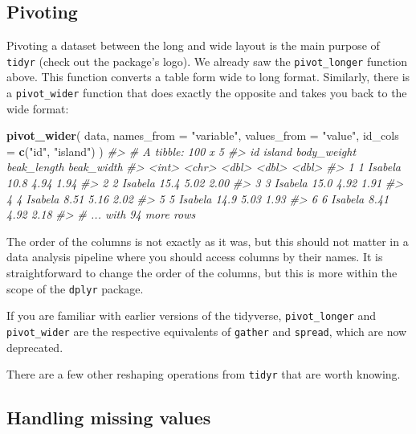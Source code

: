 \documentclass[]{book}
\newenvironment{Shaded}{}{}
\newcommand{\CommentTok}[1]{\textcolor[rgb]{0.38,0.63,0.69}{\textit{#1}}}
\newcommand{\DataTypeTok}[1]{\textcolor[rgb]{0.56,0.13,0.00}{#1}}
\newcommand{\KeywordTok}[1]{\textcolor[rgb]{0.00,0.44,0.13}{\textbf{#1}}}
\newcommand{\NormalTok}[1]{#1}
\newcommand{\StringTok}[1]{\textcolor[rgb]{0.25,0.44,0.63}{#1}}
\begin{document}
\hypertarget{pivoting}{%
\subsection{Pivoting}\label{pivoting}}

Pivoting a dataset between the long and wide layout is the main purpose of \texttt{tidyr} (check out the package's logo). We already saw the \texttt{pivot\_longer} function above. This function converts a table form wide to long format. Similarly, there is a \texttt{pivot\_wider} function that does exactly the opposite and takes you back to the wide format:

\begin{Shaded}
\begin{Highlighting}[]
\KeywordTok{pivot_wider}\NormalTok{(}
\NormalTok{  data, }
  \DataTypeTok{names_from =} \StringTok{"variable"}\NormalTok{, }
  \DataTypeTok{values_from =} \StringTok{"value"}\NormalTok{, }
  \DataTypeTok{id_cols =} \KeywordTok{c}\NormalTok{(}\StringTok{"id"}\NormalTok{, }\StringTok{"island"}\NormalTok{)}
\NormalTok{)}
\CommentTok{#> # A tibble: 100 x 5}
\CommentTok{#>      id island  body_weight beak_length beak_width}
\CommentTok{#>   <int> <chr>         <dbl>       <dbl>      <dbl>}
\CommentTok{#> 1     1 Isabela       10.8         4.94       1.94}
\CommentTok{#> 2     2 Isabela       15.4         5.02       2.00}
\CommentTok{#> 3     3 Isabela       15.0         4.92       1.91}
\CommentTok{#> 4     4 Isabela        8.51        5.16       2.02}
\CommentTok{#> 5     5 Isabela       14.9         5.03       1.93}
\CommentTok{#> 6     6 Isabela        8.41        4.92       2.18}
\CommentTok{#> # ... with 94 more rows}
\end{Highlighting}
\end{Shaded}

The order of the columns is not exactly as it was, but this should not matter in a data analysis pipeline where you should access columns by their names. It is straightforward to change the order of the columns, but this is more within the scope of the \texttt{dplyr} package.

If you are familiar with earlier versions of the tidyverse, \texttt{pivot\_longer} and \texttt{pivot\_wider} are the respective equivalents of \texttt{gather} and \texttt{spread}, which are now deprecated.

There are a few other reshaping operations from \texttt{tidyr} that are worth knowing.

\hypertarget{handling-missing-values}{%
\subsection{Handling missing values}\label{handling-missing-values}}
\end{document}
